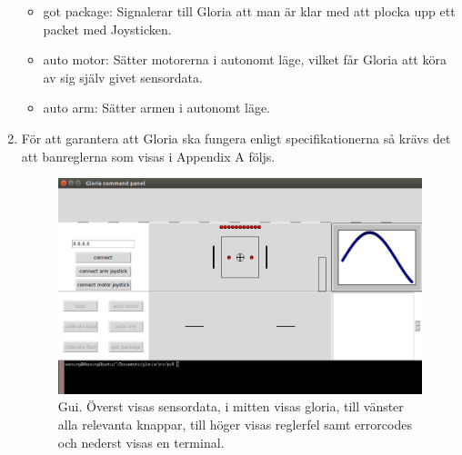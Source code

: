 \begin{enumerate}
\begin{itemize}
		\item got package: Signalerar till Gloria att man är klar med att plocka upp ett packet med Joysticken.
		\item auto motor: Sätter motorerna i autonomt läge, vilket får Gloria att köra av sig själv givet sensordata.
		\item auto arm: Sätter armen i autonomt läge.
	\end{itemize}
	\item För att garantera att Gloria ska fungera enligt specifikationerna så krävs det att banreglerna som visas i Appendix A följs.
	\begin{figure}[h!]
	\center
	\includegraphics[scale=0.5]{Gui.png}
	\endcenter
	\caption{Gui. Överst visas sensordata, i mitten visas gloria, till vänster alla relevanta knappar, till höger visas reglerfel samt errorcodes och nederst visas en terminal.}
	\end{figure}
	\newpage
\end{enumerate}